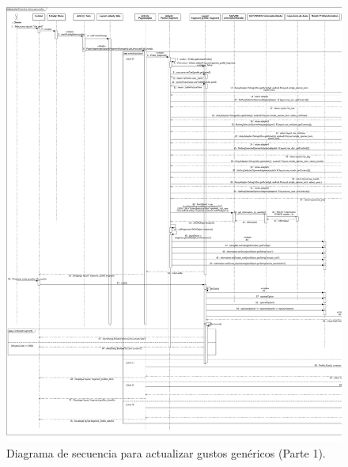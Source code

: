\FloatBarrier
\begin{figure}[htbp!]
		\centering
			\includegraphics[width=1 \textwidth]{imagenes/Diagramas_UserApp/Nuevos_diagramas/VerPerfil_1}
		\caption{Diagrama de secuencia para actualizar gustos genéricos (Parte 1).}
		\label{image:gustos2}
\end{figure}
\FloatBarrier


